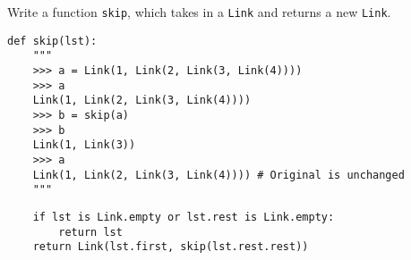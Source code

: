 \begin{blocksection}
\question Write a function \texttt{skip}, which takes in a \texttt{Link} and returns a new \texttt{Link}.

\begin{lstlisting}
def skip(lst):
    """
    >>> a = Link(1, Link(2, Link(3, Link(4))))
    >>> a
    Link(1, Link(2, Link(3, Link(4))))
    >>> b = skip(a)
    >>> b
    Link(1, Link(3))
    >>> a
    Link(1, Link(2, Link(3, Link(4)))) # Original is unchanged
    """
\end{lstlisting}
\begin{solution}[1in]
\begin{lstlisting}
    if lst is Link.empty or lst.rest is Link.empty:
        return lst
    return Link(lst.first, skip(lst.rest.rest))
\end{lstlisting}
\end{solution}
\end{blocksection}